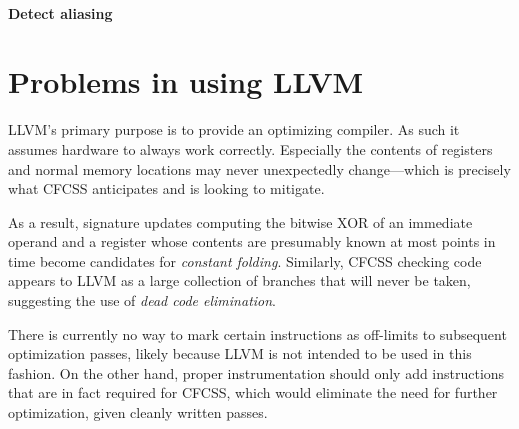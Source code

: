 
\paragraph{Detect aliasing}


\section{Problems in using LLVM}

LLVM's primary purpose is to provide an optimizing compiler. As such it assumes
hardware to always work correctly. Especially the contents of registers and
normal memory locations may never unexpectedly change—which is precisely what
CFCSS anticipates and is looking to mitigate.

As a result, signature updates computing the bitwise XOR of an immediate
operand and a register whose contents are presumably known at most points in
time become candidates for \emph{constant folding}. Similarly, CFCSS checking
code appears to LLVM as a large collection of branches that will never be
taken, suggesting the use of \emph{dead code elimination}.

There is currently no way to mark certain instructions as off-limits to
subsequent optimization passes, likely because LLVM is not intended to be used
in this fashion. On the other hand, proper instrumentation should only add
instructions that are in fact required for CFCSS, which would eliminate the
need for further optimization, given cleanly written passes.


